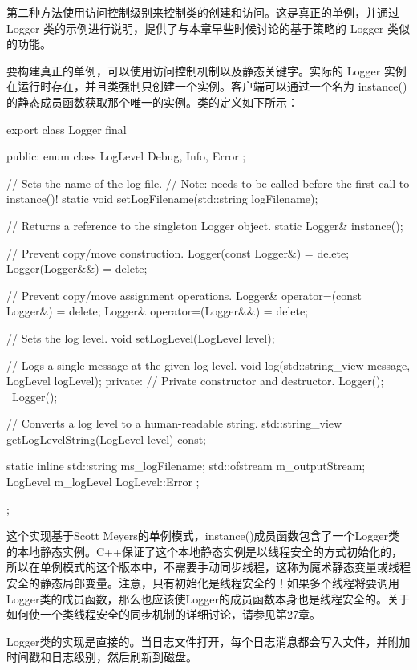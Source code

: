 第二种方法使用访问控制级别来控制类的创建和访问。这是真正的单例，并通过 Logger 类的示例进行说明，提供了与本章早些时候讨论的基于策略的 Logger 类似的功能。

要构建真正的单例，可以使用访问控制机制以及静态关键字。实际的 Logger 实例在运行时存在，并且类强制只创建一个实例。客户端可以通过一个名为 instance() 的静态成员函数获取那个唯一的实例。类的定义如下所示：

\begin{cpp}
export class Logger final
{
    public:
        enum class LogLevel { Debug, Info, Error };

        // Sets the name of the log file.
        // Note: needs to be called before the first call to instance()!
        static void setLogFilename(std::string logFilename);

        // Returns a reference to the singleton Logger object.
        static Logger& instance();

        // Prevent copy/move construction.
        Logger(const Logger&) = delete;
        Logger(Logger&&) = delete;

        // Prevent copy/move assignment operations.
        Logger& operator=(const Logger&) = delete;
        Logger& operator=(Logger&&) = delete;

        // Sets the log level.
        void setLogLevel(LogLevel level);

        // Logs a single message at the given log level.
        void log(std::string_view message, LogLevel logLevel);
    private:
        // Private constructor and destructor.
        Logger();
        ~Logger();

        // Converts a log level to a human-readable string.
        std::string_view getLogLevelString(LogLevel level) const;

        static inline std::string ms_logFilename;
        std::ofstream m_outputStream;
        LogLevel m_logLevel { LogLevel::Error };
};
\end{cpp}

这个实现基于Scott Meyers的单例模式，instance()成员函数包含了一个Logger类的本地静态实例。C++保证了这个本地静态实例是以线程安全的方式初始化的，所以在单例模式的这个版本中，不需要手动同步线程，这称为魔术静态变量或线程安全的静态局部变量。注意，只有初始化是线程安全的！如果多个线程将要调用Logger类的成员函数，那么也应该使Logger的成员函数本身也是线程安全的。关于如何使一个类线程安全的同步机制的详细讨论，请参见第27章。

Logger类的实现是直接的。当日志文件打开，每个日志消息都会写入文件，并附加时间戳和日志级别，然后刷新到磁盘。

